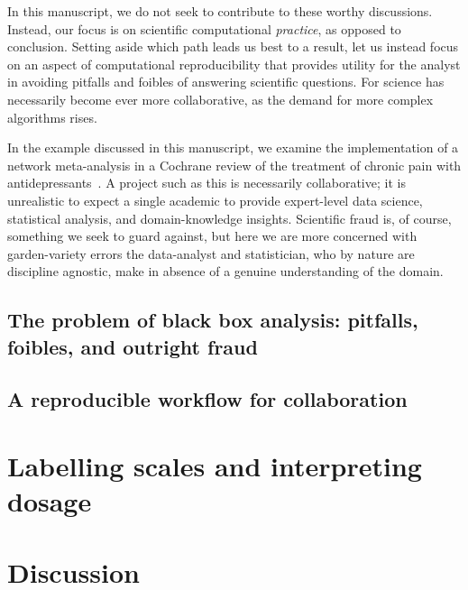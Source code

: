\documentclass{article}
\begin{document}
In this manuscript, we do not seek to contribute to these worthy discussions. Instead, our focus is on scientific computational \emph{practice}, as opposed to conclusion. Setting aside which path leads us best to a result, let us instead focus on an aspect of computational reproducibility that provides utility for the analyst in avoiding pitfalls and foibles of answering scientific questions. For science has necessarily become ever more collaborative, as the demand for more complex algorithms rises. 

In the example discussed in this manuscript, we examine the implementation of a network meta-analysis in a Cochrane review of the treatment of chronic pain with antidepressants~\cite{birkinshaw_2021}. A project such as this is necessarily collaborative; it is unrealistic to expect a single academic to provide expert-level data science, statistical analysis, and domain-knowledge insights. Scientific fraud is, of course, something we seek to guard against, but here we are more concerned with garden-variety errors the data-analyst and statistician, who by nature are discipline agnostic, make in absence of a genuine understanding of the domain. 

\subsection{The problem of black box analysis: pitfalls, foibles, and outright fraud}

\subsection{A reproducible workflow for collaboration}

\section{Labelling scales and interpreting dosage}

\section{Discussion}




\end{document}
